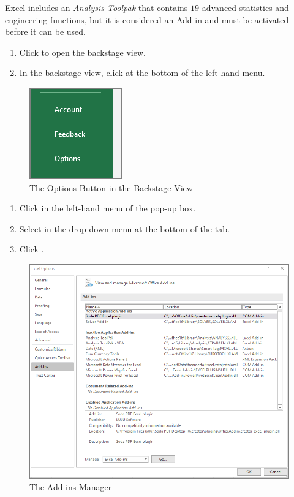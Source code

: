 Excel includes an \textit{Analysis Toolpak} that contains $ 19 $ advanced statistics and engineering functions, but it is considered an Add-in and must be activated before it can be used.

\begin{enumerate}
	\item Click  to open the backstage view.
	\item In the backstage view, click  at the bottom of the left-hand menu.
	
\end{enumerate}

\begin{figure}[H]
	\centering
	\includegraphics[width=\maxwidth{.95\linewidth}]{gfx/ch09_fig35}
	\caption{The Options Button in the Backstage View}
	\label{09:fig35}
\end{figure}

\begin{enumerate}[resume]	
	
	\item Click  in the left-hand menu of the  pop-up box.
	\item Select  in the drop-down menu at the bottom of the  tab.
	\item Click .
	
\end{enumerate}

\begin{figure}[H]
	\centering
	\includegraphics[width=\maxwidth{.95\linewidth}]{gfx/ch09_fig36}
	\caption{The Add-ins Manager}
	\label{09:fig36}
\end{figure}

